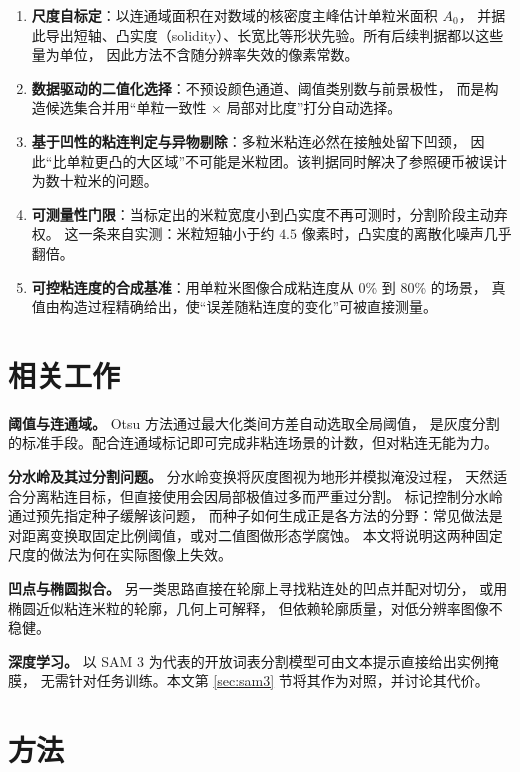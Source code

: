 \documentclass[12pt, a4paper]{ctexart}
\begin{document}
\begin{enumerate}
  \item \textbf{尺度自标定}：以连通域面积在对数域的核密度主峰估计单粒米面积 $A_0$，
        并据此导出短轴、凸实度（solidity）、长宽比等形状先验。所有后续判据都以这些量为单位，
        因此方法不含随分辨率失效的像素常数。
  \item \textbf{数据驱动的二值化选择}：不预设颜色通道、阈值类别数与前景极性，
        而是构造候选集合并用“单粒一致性 $\times$ 局部对比度”打分自动选择。
  \item \textbf{基于凹性的粘连判定与异物剔除}：多粒米粘连必然在接触处留下凹颈，
        因此“比单粒更凸的大区域”不可能是米粒团。该判据同时解决了参照硬币被误计为数十粒米的问题。
  \item \textbf{可测量性门限}：当标定出的米粒宽度小到凸实度不再可测时，分割阶段主动弃权。
        这一条来自实测：米粒短轴小于约 $4.5$ 像素时，凸实度的离散化噪声几乎翻倍。
  \item \textbf{可控粘连度的合成基准}：用单粒米图像合成粘连度从 0\% 到 80\% 的场景，
        真值由构造过程精确给出，使“误差随粘连度的变化”可被直接测量。
\end{enumerate}

\section{相关工作}

\textbf{阈值与连通域。} Otsu 方法\cite{otsu1979}通过最大化类间方差自动选取全局阈值，
是灰度分割的标准手段。配合连通域标记即可完成非粘连场景的计数，但对粘连无能为力。

\textbf{分水岭及其过分割问题。} 分水岭变换\cite{vincent1991}将灰度图视为地形并模拟淹没过程，
天然适合分离粘连目标，但直接使用会因局部极值过多而严重过分割。
标记控制分水岭通过预先指定种子缓解该问题，
而种子如何生成正是各方法的分野：常见做法是对距离变换取固定比例阈值，或对二值图做形态学腐蚀\cite{kurade2023}。
本文将说明这两种固定尺度的做法为何在实际图像上失效。

\textbf{凹点与椭圆拟合。} 另一类思路直接在轮廓上寻找粘连处的凹点并配对切分，
或用椭圆近似粘连米粒的轮廓\cite{compag2019, wheat2025}，几何上可解释，
但依赖轮廓质量，对低分辨率图像不稳健。

\textbf{深度学习。} 以 SAM 3\cite{sam3} 为代表的开放词表分割模型可由文本提示直接给出实例掩膜，
无需针对任务训练。本文第 \ref{sec:sam3} 节将其作为对照，并讨论其代价。

\section{方法}
\end{document}
